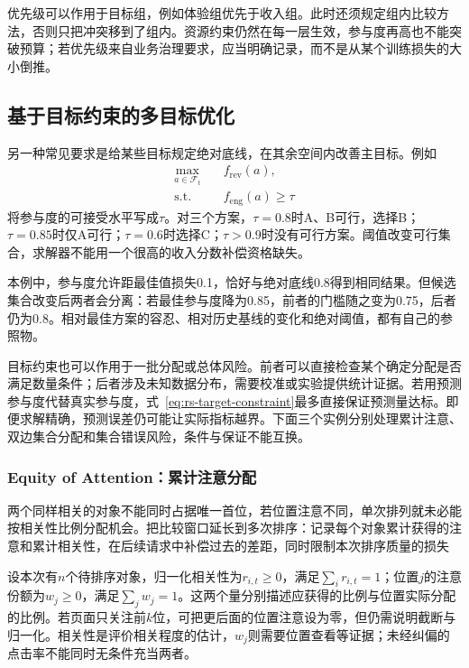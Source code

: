 优先级可以作用于目标组，例如体验组优先于收入组。此时还须规定组内比较方法，否则只把冲突移到了组内。资源约束仍然在每一层生效，参与度再高也不能突破预算；若优先级来自业务治理要求，应当明确记录，而不是从某个训练损失的大小倒推。

\subsection{基于目标约束的多目标优化}
\label{sec:rs-goal-constrained-objectives}

另一种常见要求是给某些目标规定绝对底线，在其余空间内改善主目标。例如
\begin{equation}
 \begin{aligned}
  \max_{a\in\mathcal{F}_t}\quad&f_{\mathrm{rev}}(a),\\
  \text{s.t.}\quad&f_{\mathrm{eng}}(a)\geq\tau
 \end{aligned}
 \label{eq:rs-target-constraint}
\end{equation}
将参与度的可接受水平写成$\tau$。对三个方案，$\tau=0.8$时A、B可行，选择B；$\tau=0.85$时仅A可行；$\tau=0.6$时选择C；$\tau>0.9$时没有可行方案。阈值改变可行集合，求解器不能用一个很高的收入分数补偿资格缺失。

本例中，参与度允许距最佳值损失0.1，恰好与绝对底线0.8得到相同结果。但候选集合改变后两者会分离：若最佳参与度降为0.85，前者的门槛随之变为0.75，后者仍为0.8。相对最佳方案的容忍、相对历史基线的变化和绝对阈值，都有自己的参照物。

目标约束也可以作用于一批分配或总体风险。前者可以直接检查某个确定分配是否满足数量条件；后者涉及未知数据分布，需要校准或实验提供统计证据。若用预测参与度代替真实参与度，式~\eqref{eq:rs-target-constraint}最多直接保证预测量达标。即便求解精确，预测误差仍可能让实际指标越界。下面三个实例分别处理累计注意、双边集合分配和集合错误风险，条件与保证不能互换。

\subsubsection{Equity of Attention：累计注意分配}
\label{sec:rs-equity-attention}

两个同样相关的对象不能同时占据唯一首位，若位置注意不同，单次排列就未必能按相关性比例分配机会。把比较窗口延长到多次排序：记录每个对象累计获得的注意和累计相关性，在后续请求中补偿过去的差距，同时限制本次排序质量的损失

设本次有$n$个待排序对象，归一化相关性为$r_{i,t}\geq0$，满足$\sum_i r_{i,t}=1$；位置$j$的注意份额为$w_j\geq0$，满足$\sum_j w_j=1$。这两个量分别描述应获得的比例与位置实际分配的比例。若页面只关注前$k$位，可把更后面的位置注意设为零，但仍需说明截断与归一化。相关性是评价相关程度的估计，$w_j$则需要位置查看等证据；未经纠偏的点击率不能同时无条件充当两者。

